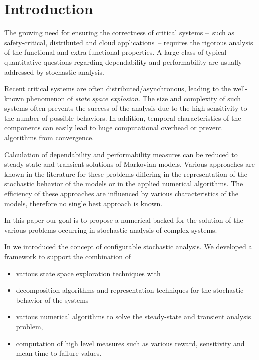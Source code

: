 \chapter{Introduction}
\label{chap:introduction}

The growing need for ensuring the correctness of critical systems
--~such as safety-critical, distributed and cloud applications~--
requires the rigorous analysis of the functional and extra-functional
properties.  A large class of typical quantitative questions regarding
dependability and performability are usually addressed by stochastic
analysis.

Recent critical systems are often distributed/asynchronous, leading to
the well-known phenomenon of \emph{state space explosion}. The size
and complexity of such systems often prevents the success of the
analysis due to the high sensitivity to the number of possible
behaviors. In addition, temporal characteristics of the components can
easily lead to huge computational overhead or prevent algorithms from
convergence.

Calculation of dependability and performability measures can be
reduced to steady-state and transient solutions of Markovian
models. Various approaches are known in the literature for these
problems differing in the representation of the stochastic behavior of
the models or in the applied numerical algorithms. The efficiency of
these approaches are influenced by various characteristics of the
models, therefore no single best approach is known.

In this paper our goal is to propose a numerical backed for the
solution of the various problems occurring in stochastic analysis of
complex systems.

In \cite{TDK2015_Klenik_Marussy} we introduced the concept of
configurable stochastic analysis. We developed a framework to support
the combination of
\begin{itemize}
\item various state space exploration techniques with
\item decomposition algorithms and representation
  techniques for the stochastic behavior of the systems 
\item various numerical algorithms to solve the steady-state and
  transient analysis problem,
\item computation of high level measures such as various reward,
  sensitivity and mean time to failure values.
\end{itemize}

